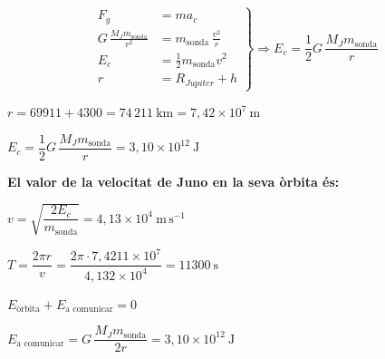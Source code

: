 \begin{solapartat}
\[ \left.\begin{aligned}
F_g &= ma_c\\
G\,\frac{M_J m_\mathrm{sonda}}{r^2} &= m_\mathrm{sonda}\,\frac{v^2}{r}\\
E_c &= \frac{1}{2}m_\mathrm{sonda}v^2\\
r &= R_{\mathit{Jupiter}} + h
\end{aligned}\right\}\Rightarrow E_c = \frac{1}{2}G\,\frac{M_J m_\mathrm{sonda}}{r} \]

 $r = 69911 + 4300 = 74\,211\ \mathrm{km} = 7,42\times 10^{7}\ \mathrm{m}$

 $E_c = \dfrac{1}{2}G\,\dfrac{M_J m_\mathrm{sonda}}{r} = 3,10\times 10^{12}\ \mathrm{J}$

\textbf{El valor de la velocitat de Juno en la seva òrbita és:}

 $v = \sqrt{\dfrac{2E_c}{m_\mathrm{sonda}}} = 4,13\times 10^{4}\ \mathrm{m\,s^{-1}}$

 $T = \dfrac{2\pi r}{v} = \dfrac{2\pi\cdot 7,4211\times 10^{7}}{4,132\times 10^{4}} = 11300\ \mathrm{s}$
\end{solapartat}

\begin{solapartat}
 $E_\text{òrbita} + E_\text{a comunicar} = 0$

 $E_\text{a comunicar} = G\,\dfrac{M_J m_\mathrm{sonda}}{2r} = 3,10\times 10^{12}\ \mathrm{J}$
\end{solapartat}

